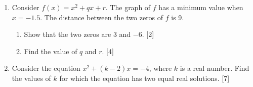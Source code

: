 \documentclass[12pt, twoside]{article}
\begin{document}
\begin{enumerate}
\newpage
  \item Consider $f(x)=x^2+qx+r$. The graph of $f$ has a minimum value when $x=-1.5$. The distance between the two zeros of $f$ is 9.
    \begin{enumerate}
      \item Show that the two zeros are 3 and $-6$. \hfill [2]
      \item Find the value of $q$ and $r$. \hfill [4]
    \end{enumerate}

  \item Consider the equation $x^2 + (k-2)x=-4$, where $k$ is a real number. Find the values of $k$ for which the equation has two equal real solutions.  \hfill [7]
  \begin{center}
  \end{center}


\end{enumerate}
\end{document}

